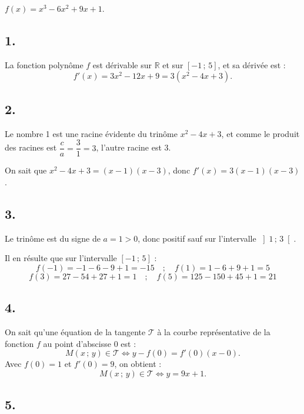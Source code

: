 \(f(x) = x^3 - 6x^2 + 9x + 1\).

\subsection*{1.}

La fonction polynôme \(f\) est dérivable sur \(\mathbb{R}\) et sur \([-1\,;\,5]\), et sa dérivée est :
\[
f'(x) = 3x^2 - 12x + 9 = 3(x^2 - 4x + 3).
\]

\subsection*{2.}

Le nombre 1 est une racine évidente du trinôme \(x^2 - 4x + 3\), et comme le produit des racines est \(\dfrac{c}{a} = \dfrac{3}{1} = 3\), l'autre racine est 3.

On sait que \(x^2 - 4x + 3 = (x - 1)(x - 3)\), donc \(f'(x) = 3(x - 1)(x - 3)\).

\subsection*{3.}

Le trinôme est du signe de \(a = 1 > 0\), donc positif sauf sur l'intervalle \(\left]1\,;\,3\right[\).  

Il en résulte que sur l'intervalle \([-1\,;\,5]\) :
\[f(-1) = -1 - 6 - 9 + 1 = -15 \quad ; \quad f(1) = 1 - 6 + 9 + 1 = 5\]
\[f(3) = 27 - 54 + 27 + 1 = 1 \quad ; \quad f(5) = 125 - 150 + 45 + 1 = 21\]
\begin{center}
\end{center}

\subsection*{4.}

On sait qu'une équation de la tangente \(\mathcal{T}\) à la courbe représentative de la fonction \(f\) au point d'abscisse \(0\) est :
\[
M(x\,;\,y) \in \mathcal{T} \iff y - f(0) = f'(0)(x - 0).
\]
Avec \(f(0) = 1\) et \(f'(0) = 9\), on obtient :
\[
M(x\,;\,y) \in \mathcal{T} \iff y = 9x + 1.
\]

\subsection*{5.}

